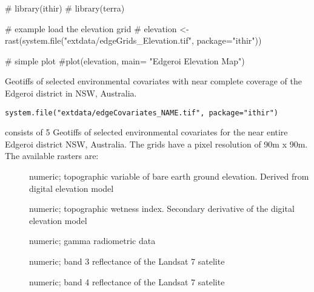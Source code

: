 \documentclass[a4paper]{book}
\begin{document}
%
\begin{Examples}
\begin{ExampleCode}

# library(ithir)
# library(terra)

# example load the elevation grid
# elevation <- rast(system.file("extdata/edgeGrids_Elevation.tif", package="ithir"))

# simple plot
#plot(elevation, main= "Edgeroi Elevation Map")

\end{ExampleCode}
\end{Examples}
%
\begin{Description}
Geotiffs of selected environmental covariates with near complete coverage of the Edgeroi district in NSW, Australia.
\end{Description}
%
\begin{Usage}
\begin{verbatim}
system.file("extdata/edgeCovariates_NAME.tif", package="ithir")
\end{verbatim}
\end{Usage}
%
\begin{Format}
 consists of 5 Geotiffs of selected environmental covariates for the near entire Edgeroi district NSW, Australia. The grids have a pixel resolution of 90m x 90m. The available rasters are:
\begin{description}

\item[] numeric; topographic variable of bare earth ground elevation. Derived from digital elevation model
\item[] numeric; topographic wetness index. Secondary derivative of the digital elevation model
\item[] numeric; gamma radiometric data
\item[] numeric; band 3 reflectance of the Landsat 7 satelite  
\item[] numeric; band 4 reflectance of the Landsat 7 satelite  

\end{description}

\end{Format}
\end{document}
